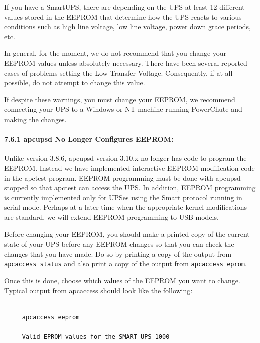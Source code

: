 {{{{{{{{{\label{index-eeprom_002c-configuring-140}
\label{index-Configuring_002c-eeprom-141}
If you have a SmartUPS, there are depending on the UPS at least 12 different
values stored in the EEPROM that determine how the UPS reacts to various
conditions such as high line voltage, low line voltage, power down grace
periods, etc.  

In general, for the moment, we do not recommend that you change your EEPROM
values unless absolutely necessary. There have been several reported cases of
problems setting the Low Transfer Voltage. Consequently, if at all possible,
do not attempt to change this value.  

If despite these warnings, you must change your EEPROM, we recommend
connecting your UPS to a Windows or NT machine running PowerChute and making
the changes. 

\label{apcupsd-No-Longer-Configures-EEPROM}

\paragraph*{7.6.1 apcupsd No Longer Configures EEPROM:}

Unlike version 3.8.6, apcupsd version 3.10.x no longer has code to program the
EEPROM. Instead we have implemented interactive EEPROM modification code in
the apctest program. EEPROM programming must be done with apcupsd stopped so
that apctest can access the UPS. In addition, EEPROM programming is currently
implemented only for UPSes using the Smart protocol running in serial mode.
Perhaps at a later time when the appropriate kernel modifications are
standard, we will extend EEPROM programming to USB models.  

Before changing your EEPROM, you should make a printed copy of the current
state of your UPS before any EEPROM changes so that you can check the changes
that you have made. Do so by printing a copy of the output from {\tt apcaccess
status} and also print a copy of the output from {\tt apcaccess eprom}.  

Once this is done, choose which values of the EEPROM you want to change.
Typical output from apcaccess should look like the following: 

\footnotesize
\begin{verbatim}
     
     apcaccess eeprom
     
     Valid EPROM values for the SMART-UPS 1000
     

\end{verbatim}}}}}}}}}}
